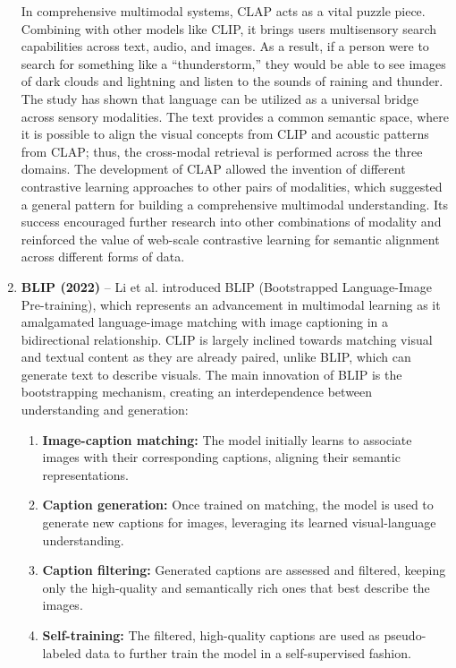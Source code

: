 \documentclass[conference]{IEEEtran}
\begin{document}
\begin{enumerate}
In comprehensive multimodal systems, CLAP acts as a vital puzzle piece. Combining with other models like CLIP, it brings users multisensory search capabilities across text, audio, and images. As a result, if a person were to search for something like a “thunderstorm,” they would be able to see images of dark clouds and lightning and listen to the sounds of raining and thunder.
The study has shown that language can be utilized as a universal bridge across sensory modalities. The text provides a common semantic space, where it is possible to align the visual concepts from CLIP and acoustic patterns from CLAP; thus, the cross-modal retrieval is performed across the three domains.
The development of CLAP allowed the invention of different contrastive learning approaches to other pairs of modalities, which suggested a general pattern for building a comprehensive multimodal understanding. Its success encouraged further research into other combinations of modality and reinforced the value of web-scale contrastive learning for semantic alignment across different forms of data.
    

\item \textbf{BLIP (2022)} – Li et al. \cite{li2022blip} introduced BLIP (Bootstrapped Language-Image Pre-training), which represents an advancement in multimodal learning as it amalgamated language-image matching with image captioning in a bidirectional relationship. CLIP is largely inclined towards matching visual and textual content as they are already paired, unlike BLIP, which can generate text to describe visuals.
The main innovation of BLIP is the bootstrapping mechanism, creating an interdependence between understanding and generation:

\begin{enumerate}
    \item \textbf{Image-caption matching:} The model initially learns to associate images with their corresponding captions, aligning their semantic representations.
    
    \item \textbf{Caption generation:} Once trained on matching, the model is used to generate new captions for images, leveraging its learned visual-language understanding.
    
    \item \textbf{Caption filtering:} Generated captions are assessed and filtered, keeping only the high-quality and semantically rich ones that best describe the images.
    
    \item \textbf{Self-training:} The filtered, high-quality captions are used as pseudo-labeled data to further train the model in a self-supervised fashion.
    

\end{enumerate}
\end{enumerate}
\end{document}
